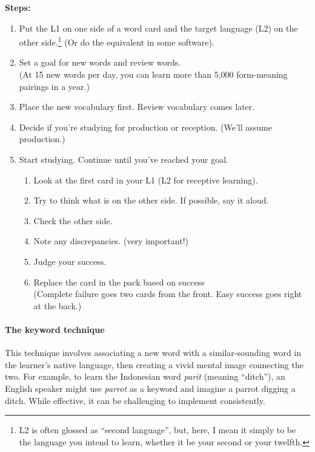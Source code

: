 \begin{tcolorbox}[title=Flashcard Study Technique, colback=white, colframe=blue!75!black, fonttitle=\bfseries]

\textbf{Steps:}

\begin{enumerate}
    \item Put the L1 on one side of a word card and the target language (L2) on the other side.\footnote{L2 is often glossed as ``second language'', but, here, I mean it simply to be the language you intend to learn, whether it be your second or your twelfth.} (Or do the equivalent in some software).
    
    \item Set a goal for new words and review words.\\
    (At 15 new words per day, you can learn more than 5,000 form-meaning pairings in a year.)
    
    \item Place the new vocabulary first. Review vocabulary comes later.
    
    \item Decide if you're studying for production or reception. (We'll assume production.)
    
    \item Start studying. Continue until you've reached your goal.
    \begin{enumerate}
        \item Look at the first card in your L1 (L2 for receptive learning).
        \item Try to think what is on the other side. If possible, say it aloud.
        \item Check the other side.
        \item Note any discrepancies. (very important!)
        \item Judge your success.
        \item Replace the card in the pack based on success\\
        (Complete failure goes two cards from the front. Easy success goes right at the back.)
    \end{enumerate}
\end{enumerate}

\end{tcolorbox}
\newpage
\paragraph*{The keyword technique} This technique involves associating a new word with a similar-sounding word in the learner's native language, then creating a vivid mental image connecting the two. For example, to learn the Indonesian word \textit{parit} (meaning ``ditch''), an English speaker might use \textit{parrot} as a keyword and imagine a parrot digging a ditch. While effective, it can be challenging to implement consistently.

